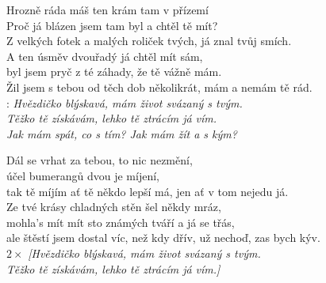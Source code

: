 
Hrozně ráda máš ten krám tam v přízemí\\
Proč já blázen jsem tam byl a chtěl tě mít?\\
Z velkých fotek a malých roliček tvých, já znal tvůj smích.\\

A ten úsměv dvouřadý já chtěl mít sám,\\
byl jsem pryč z té záhady, že tě vážně mám.\\
Žil jsem s tebou od těch dob několikrát, mám a nemám tě rád.\\

\textregistered:
\emph{
Hvězdičko blýskavá, mám život svázaný s tvým.\\
Těžko tě získávám, lehko tě ztrácím já vím.\\
Jak mám spát, co s tím? Jak mám žít a s kým?\\
}

Dál se vrhat za tebou, to nic nezmění,\\
účel bumerangů dvou je míjení,\\
tak tě míjím ať tě někdo lepší má, jen ať v tom nejedu já.\\

Ze tvé krásy chladných stěn šel někdy mráz,\\
mohla's mít mít sto známých tváří a já se třás,\\
ale štěstí jsem dostal víc, než kdy dřív, už nechoď, zas bych kýv. \textregistered\\

$2 \times$ \emph{[Hvězdičko blýskavá, mám život svázaný s tvým.\\
Těžko tě získávám, lehko tě ztrácím já vím.]}\\

\newpage
